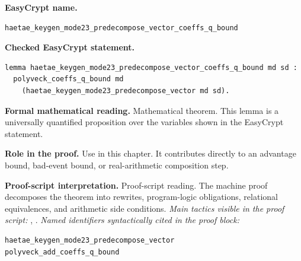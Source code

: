\begin{formaltheorem}
\noindent\textbf{EasyCrypt name.}
\begin{lstlisting}[language=EasyCrypt,basicstyle=\ttfamily\scriptsize]
haetae_keygen_mode23_predecompose_vector_coeffs_q_bound
\end{lstlisting}
\noindent\textbf{Checked EasyCrypt statement.}
\begin{lstlisting}[language=EasyCrypt,basicstyle=\ttfamily\scriptsize]
lemma haetae_keygen_mode23_predecompose_vector_coeffs_q_bound md sd :
  polyveck_coeffs_q_bound md
    (haetae_keygen_mode23_predecompose_vector md sd).
\end{lstlisting}
\noindent\textbf{Formal mathematical reading.}
Mathematical theorem. This lemma is a universally quantified proposition over the variables shown in the EasyCrypt statement.

\noindent\textbf{Role in the proof.}
Use in this chapter. It contributes directly to an advantage bound, bad-event bound, or real-arithmetic composition step.

\noindent\textbf{Proof-script interpretation.}
Proof-script reading. The machine proof decomposes the theorem into rewrites, program-logic obligations, relational equivalences, and arithmetic side conditions.
\emph{Main tactics visible in the proof script:} , .
\emph{Named identifiers syntactically cited in the proof block:}
\begin{lstlisting}[language=EasyCrypt,basicstyle=\ttfamily\scriptsize]
haetae_keygen_mode23_predecompose_vector
polyveck_add_coeffs_q_bound
\end{lstlisting}

\end{formaltheorem}

